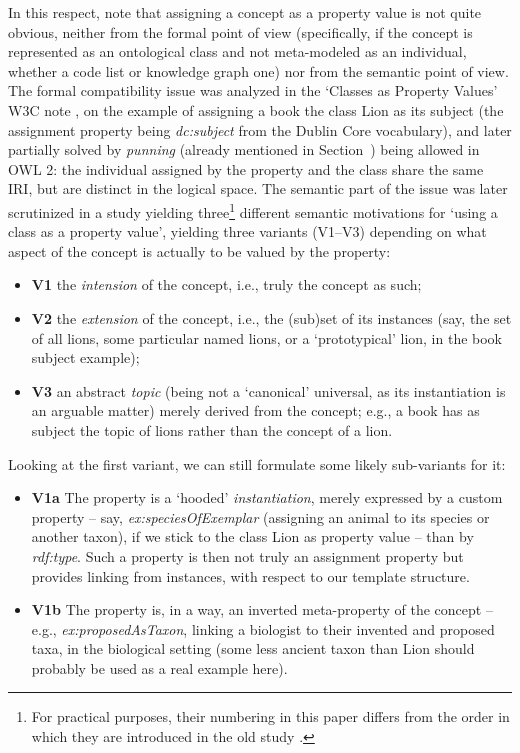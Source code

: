 In this respect, note that assigning a concept as a property value is not quite obvious, neither from the formal point of view (specifically, if the concept is represented as an ontological class and not meta-modeled as an individual, whether a code list or knowledge graph one) nor from the semantic point of view.
    The formal compatibility issue was analyzed in the `Classes as Property Values' W3C note \cite{CPV}, on the example of assigning a book the class Lion as its subject (the assignment property being \emph{dc:subject} from the Dublin Core vocabulary), and later partially solved by \emph{punning} (already mentioned in Section~\label{ss:def_type}) being allowed in OWL 2: the individual assigned by the property and the class share the same IRI, but are distinct in the logical space.
The semantic part of the issue was later scrutinized in a study \cite{KCap13} yielding three\footnote{For practical purposes, their numbering in this paper differs from the order in which they are introduced in the old study \cite{KCap13}.} different semantic motivations for `using a class as a property value', yielding three variants (V1--V3) depending on what aspect of the concept is actually to be valued by the property: 
\begin{itemize}
    \item \textbf{V1} the \emph{intension} of the concept, i.e., truly the concept as such;
    \item \textbf{V2} the \emph{extension} of the concept, i.e., the (sub)set of its instances (say, the set of all lions, some particular named lions, or a `prototypical' lion, in the book subject example);
    \item \textbf{V3}  an abstract \emph{topic} (being not a `canonical' universal, as its instantiation is an arguable matter) merely derived from the concept; e.g., a book has as subject the topic of lions rather than the concept of a lion.
    \end{itemize}
Looking at the first variant, we can still formulate some likely sub-variants for it: 
\begin{itemize}
    \item \textbf{V1a} The property is a `hooded' \emph{instantiation}, merely expressed by a custom property -- say, \emph{ex:speciesOfExemplar} (assigning an animal to its species or another taxon), if we stick to the class Lion as property value -- than by \emph{rdf:type}. Such a property is then not truly an assignment property but provides linking from instances, with respect to our template structure.
    \item \textbf{V1b} The property is, in a way, an inverted meta-property of the concept -- e.g., \emph{ex:proposedAsTaxon}, linking a biologist to their invented and proposed taxa, in the biological setting (some less ancient taxon than Lion should probably be used as a real example here). 
\end{itemize}

